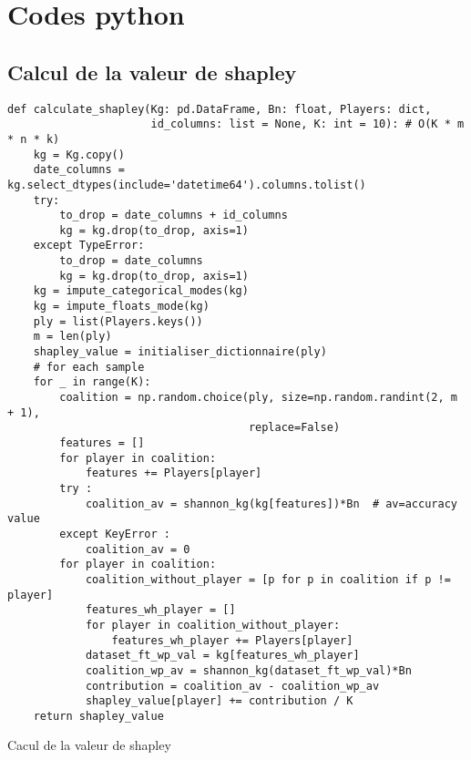 \chapter{Codes python} \label{annexe:codes_python}

\section{Calcul de la valeur de shapley} \label{ansec:shapley_compute}
\begin{listing} [H]
\begin{verbatim}
def calculate_shapley(Kg: pd.DataFrame, Bn: float, Players: dict,
                      id_columns: list = None, K: int = 10): # O(K * m * n * k)
    kg = Kg.copy()
    date_columns = kg.select_dtypes(include='datetime64').columns.tolist()
    try:
        to_drop = date_columns + id_columns
        kg = kg.drop(to_drop, axis=1)
    except TypeError:
        to_drop = date_columns
        kg = kg.drop(to_drop, axis=1)
    kg = impute_categorical_modes(kg)
    kg = impute_floats_mode(kg)
    ply = list(Players.keys())
    m = len(ply)
    shapley_value = initialiser_dictionnaire(ply)
    # for each sample
    for _ in range(K):
        coalition = np.random.choice(ply, size=np.random.randint(2, m + 1),
                                     replace=False)
        features = []
        for player in coalition:
            features += Players[player]
        try :
            coalition_av = shannon_kg(kg[features])*Bn  # av=accuracy value
        except KeyError :
            coalition_av = 0
        for player in coalition:
            coalition_without_player = [p for p in coalition if p != player]
            features_wh_player = []
            for player in coalition_without_player:
                features_wh_player += Players[player]
            dataset_ft_wp_val = kg[features_wh_player]
            coalition_wp_av = shannon_kg(dataset_ft_wp_val)*Bn
            contribution = coalition_av - coalition_wp_av
            shapley_value[player] += contribution / K
    return shapley_value
\end{verbatim}
\caption{Cacul de la valeur de shapley}
\label{code:shapley_compute}
\end{listing}


